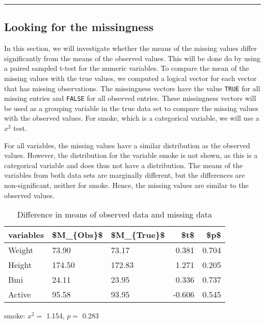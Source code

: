 \documentclass[
]{article}
\begin{document}
\begin{center}\rule{0.5\linewidth}{0.5pt}\end{center}

\hypertarget{looking-for-the-missingness}{%
\subsection{Looking for the missingness}\label{looking-for-the-missingness}}

In this section, we will investigate whether the means of the missing values differ significantly from the means of the observed values. This will be done do by using a paired sampled t-test for the numeric variables. To compare the mean of the missing values with the true values, we computed a logical vector for each vector that has missing observations. The missingness vectors have the value \texttt{TRUE} for all missing entries and \texttt{FALSE} for all observed entries. These missingness vectors will be used as a grouping variable in the true data set to compare the missing values with the observed values.
For smoke, which is a categorical variable, we will use a \(x^2\) test.

For all variables, the missing values have a similar distribution as the observed values. However, the distribution for the variable smoke is not shown, as this is a categorical variable and does thus not have a distribution. The means of the variables from both data sets are marginally different, but the differences are non-significant, neither for smoke. Hence, the missing values are similar to the observed values.

\begin{table}

\caption{\label{tab:mnar-t}Difference in means of observed data and missing data}
\centering
\begin{tabular}[t]{l|l|l|r|r}
\hline
variables & \$M\_\{Obs\}\$ & \$M\_\{True\}\$ & \$t\$ & \$p\$\\
\hline
Weight & 73.90 & 73.17 & 0.381 & 0.704\\
\hline
Height & 174.50 & 172.83 & 1.271 & 0.205\\
\hline
Bmi & 24.11 & 23.95 & 0.336 & 0.737\\
\hline
Active & 95.58 & 93.95 & -0.606 & 0.545\\
\hline
\end{tabular}
\end{table}

smoke: \(x^2 =\) 1.154, \(p =\) 0.283
\end{document}
